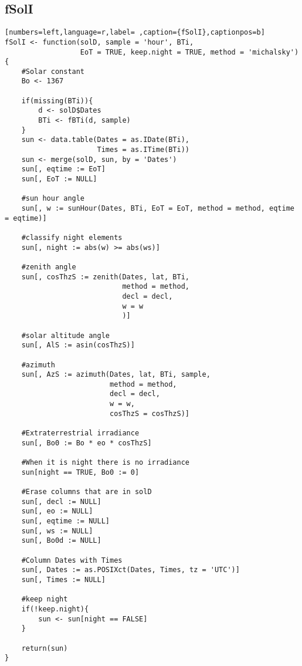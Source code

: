 \subsection{fSolI}
\label{sec:org7c486b8}
\begin{lstlisting}[numbers=left,language=r,label= ,caption={fSolI},captionpos=b]
fSolI <- function(solD, sample = 'hour', BTi,
                  EoT = TRUE, keep.night = TRUE, method = 'michalsky')
{
    #Solar constant
    Bo <- 1367

    if(missing(BTi)){
        d <- solD$Dates
        BTi <- fBTi(d, sample)
    }
    sun <- data.table(Dates = as.IDate(BTi),
                      Times = as.ITime(BTi))
    sun <- merge(solD, sun, by = 'Dates')
    sun[, eqtime := EoT]
    sun[, EoT := NULL]

    #sun hour angle
    sun[, w := sunHour(Dates, BTi, EoT = EoT, method = method, eqtime = eqtime)]

    #classify night elements
    sun[, night := abs(w) >= abs(ws)]

    #zenith angle
    sun[, cosThzS := zenith(Dates, lat, BTi,
                            method = method,
                            decl = decl,
                            w = w
                            )]

    #solar altitude angle
    sun[, AlS := asin(cosThzS)]

    #azimuth
    sun[, AzS := azimuth(Dates, lat, BTi, sample,
                         method = method,
                         decl = decl, 
                         w = w,
                         cosThzS = cosThzS)]

    #Extraterrestrial irradiance
    sun[, Bo0 := Bo * eo * cosThzS]

    #When it is night there is no irradiance
    sun[night == TRUE, Bo0 := 0]

    #Erase columns that are in solD
    sun[, decl := NULL]
    sun[, eo := NULL]
    sun[, eqtime := NULL]
    sun[, ws := NULL]
    sun[, Bo0d := NULL]

    #Column Dates with Times
    sun[, Dates := as.POSIXct(Dates, Times, tz = 'UTC')]
    sun[, Times := NULL]

    #keep night
    if(!keep.night){
        sun <- sun[night == FALSE]
    }

    return(sun)
}
\end{lstlisting}
